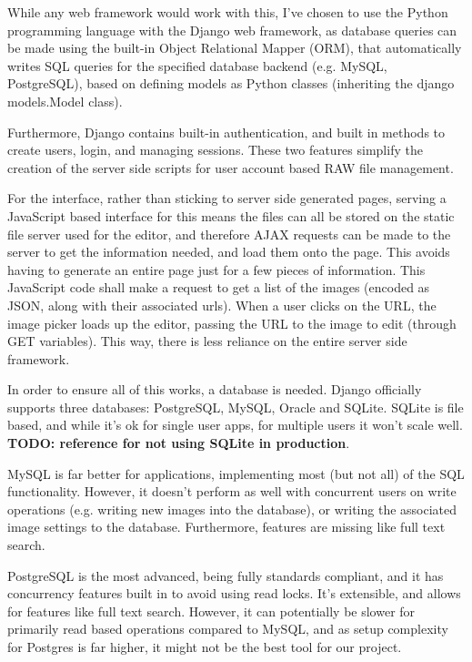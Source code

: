 \documentclass[12pt,a4paper]{article}
\begin{document}
While any web framework would work with this, I've chosen to use the Python programming
language with the Django web framework, as database queries can be made using the built-in
Object Relational Mapper (ORM), that automatically writes SQL queries for the specified
database backend (e.g. MySQL, PostgreSQL), based on defining models as Python classes (inheriting
the django models.Model class).

Furthermore, Django contains built-in authentication, and built in methods to create users,
login, and managing sessions. These two features simplify the creation of the server side scripts
for user account based RAW file management.

For the interface, rather than sticking to server side generated pages, serving a JavaScript based
interface for this means the files can all be stored on the static file server used for the editor,
and therefore AJAX requests can be made to the server to get the information needed, and load them
onto the page. This avoids having to generate an entire page just for a few pieces of information. This
JavaScript code shall make a request to get a list of the images (encoded as JSON, along with their associated
urls). When a user clicks on the URL, the image picker loads up the editor, passing the URL to the image to edit (through
GET variables). This way, there is less reliance on the entire server side framework.

In order to ensure all of this works, a database is needed. Django officially supports three databases:
PostgreSQL, MySQL, Oracle and SQLite. SQLite is file based, and while it's ok for single user apps, for
multiple users it won't scale well. \textbf{TODO: reference for not using SQLite in production}.

MySQL is far better for applications, implementing most (but not all) of the SQL functionality. However,
it doesn't perform as well with concurrent users on write operations (e.g. writing new images into the database),
or writing the associated image settings to the database. Furthermore, features are missing like full text search.

 PostgreSQL is the most advanced, being fully standards compliant, and it has concurrency features built in to avoid using read locks.
 It's extensible, and allows for features like full text search. However, it can potentially be slower for primarily read based operations
 compared to MySQL, and as setup complexity for Postgres is far higher, it might not be the best tool for our project.
\end{document}
